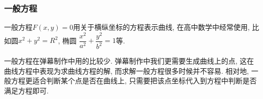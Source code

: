 \subsubsection{一般方程}

一般方程$F(x,y)=0$用关于横纵坐标的方程表示曲线,
在高中数学中经常使用, 比如圆$x^2+y^2=R^2$, 椭圆
$\dfrac{x^2}{a^2}+\dfrac{y^2}{b^2}=1$等.

一般方程在弹幕制作中用的比较少.
弹幕制作中我们更需要生成曲线上的点,
这在曲线方程中表现为求曲线方程的解,
而求解一般方程很多时候并不容易.
相对地, 一般方程更适合判断某个点是否在曲线上,
只需要把该点坐标代入到方程中判断是否满足方程即可.

\begin{center}
\end{center}
